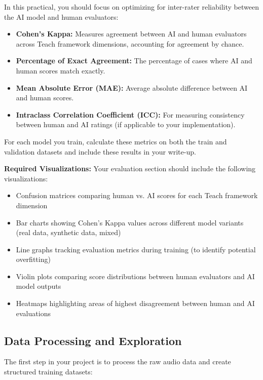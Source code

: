 \documentclass[11pt]{article}
\begin{document}
In this practical, you should focus on optimizing for inter-rater reliability between the AI model and human evaluators:

\begin{itemize}
    \item \textbf{Cohen's Kappa:} Measures agreement between AI and human evaluators across Teach framework dimensions, accounting for agreement by chance.
    \item \textbf{Percentage of Exact Agreement:} The percentage of cases where AI and human scores match exactly.
    \item \textbf{Mean Absolute Error (MAE):} Average absolute difference between AI and human scores.
    \item \textbf{Intraclass Correlation Coefficient (ICC):} For measuring consistency between human and AI ratings (if applicable to your implementation).
\end{itemize}

For each model you train, calculate these metrics on both the train and validation datasets and include these results in your write-up.

\textbf{Required Visualizations:} Your evaluation section should include the following visualizations:
\begin{itemize}
    \item Confusion matrices comparing human vs. AI scores for each Teach framework dimension
    \item Bar charts showing Cohen's Kappa values across different model variants (real data, synthetic data, mixed)
    \item Line graphs tracking evaluation metrics during training (to identify potential overfitting)
    \item Violin plots comparing score distributions between human evaluators and AI model outputs
    \item Heatmaps highlighting areas of highest disagreement between human and AI evaluations
\end{itemize}

\subsection{Data Processing and Exploration}

The first step in your project is to process the raw audio data and create structured training datasets:
\end{document}
